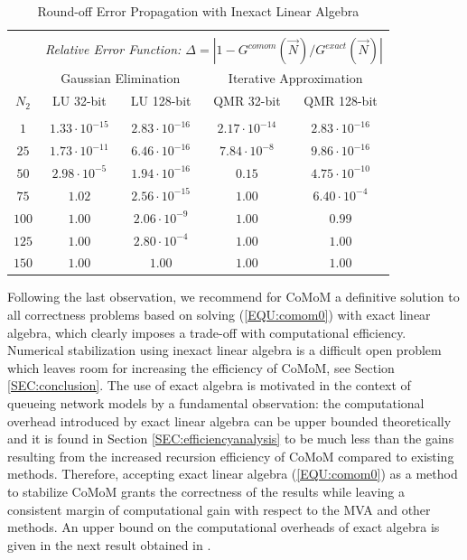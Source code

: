 \documentclass[journal,twocolumn,9.5pt]{IEEEtran}
\begin{document}
\begin{table}[t]
\centering
\caption{Round-off Error Propagation with Inexact Linear Algebra}
\begin{tabular}{|c|cc|cc|}
\hline\\[-8pt]
      & \multicolumn{4}{|c|}{\em Relative Error Function: $\Delta=|1-G^{comom}(\vec N)/G^{exact}(\vec N)|$}  \\
\hline
      & \multicolumn{2}{|c|}{Gaussian Elimination} & \multicolumn{2}{|c|}{Iterative Approximation}  \\
$N_2$ & LU 32-bit &  LU 128-bit & QMR 32-bit & QMR 128-bit \\
\hline\\[-8pt]
$1$& $1.33\cdot 10^{-15}$ & $2.83\cdot 10^{-16}$ & $2.17\cdot 10^{-14}$& $2.83\cdot 10^{-16}$ \\
$25$& $1.73\cdot 10^{-11}$ & $6.46\cdot 10^{-16}$ & $7.84\cdot 10^{-8}$ & $9.86\cdot 10^{-16}$ \\
$50$& $2.98\cdot 10^{-5}$ & $1.94\cdot 10^{-16}$ & $0.15$ & $4.75\cdot 10^{-10}$ \\
$75$& $1.02$ & $2.56\cdot 10^{-15}$ & $1.00$ & $6.40\cdot 10^{-4}$ \\
$100$& $1.00$ & $2.06\cdot 10^{-9}$ & $1.00$ & $0.99$ \\
$125$& $1.00$ & $2.80\cdot 10^{-4}$ & $1.00$ & $1.00$ \\
$150$& $1.00$ & $1.00$ & $1.00$ & $1.00$ \\
\hline
\end{tabular}
\label{TAB:roundoff}
\end{table}

Following the last observation, we recommend for CoMoM a {definitive} solution to all {correctness} problems based on solving (\ref{EQU:comom0}) with exact linear algebra, which clearly imposes a trade-off with computational efficiency. Numerical stabilization using inexact linear algebra is a difficult open problem which leaves room for increasing the efficiency of CoMoM, see Section \ref{SEC:conclusion}. The use of exact algebra is motivated in the context of queueing network models by a fundamental observation: the computational overhead introduced by exact linear algebra can be upper bounded theoretically and it is found in Section \ref{SEC:efficiencyanalysis} to be much less than the gains resulting from the increased recursion efficiency of CoMoM compared to existing methods. Therefore, accepting exact linear algebra (\ref{EQU:comom0}) as a method to stabilize CoMoM grants the correctness of the results while leaving a consistent margin of computational gain with respect to the MVA and other methods. An upper bound on the computational overheads of exact algebra is given in the next result obtained in \cite{Cas06b}.
\end{document}
